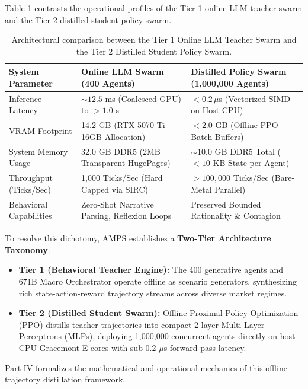 Table \ref{tab:online_vs_distilled_swarm} contrasts the operational profiles of the Tier 1 online LLM teacher swarm and the Tier 2 distilled student policy swarm.

\begin{table}[htbp]
\centering
\small
\begin{tabularx}{\textwidth}{p{4.0cm} p{4.6cm} X}
\toprule
\textbf{System Parameter} & \textbf{Online LLM Swarm (400 Agents)} & \textbf{Distilled Policy Swarm (1,000,000 Agents)} \\
\midrule
Inference Latency & $\sim 12.5$ ms (Coalesced GPU) to $> 1.0$ s & $< 0.2\,\mu$s (Vectorized SIMD on Host CPU) \\
VRAM Footprint & 14.2 GB (RTX 5070 Ti 16GB Allocation) & $< 2.0$ GB (Offline PPO Batch Buffers) \\
System Memory Usage & 32.0 GB DDR5 (2MB Transparent HugePages) & $\sim 10.0$ GB DDR5 Total ($< 10$ KB State per Agent) \\
Throughput (Ticks/Sec) & 1,000 Ticks/Sec (Hard Capped via SIRC) & $> 100,000$ Ticks/Sec (Bare-Metal Parallel) \\
Behavioral Capabilities & Zero-Shot Narrative Parsing, Reflexion Loops & Preserved Bounded Rationality \& Contagion \\
\bottomrule
\end{tabularx}
\caption{Architectural comparison between the Tier 1 Online LLM Teacher Swarm and the Tier 2 Distilled Student Policy Swarm.}
\label{tab:online_vs_distilled_swarm}
\end{table}

To resolve this dichotomy, AMPS establishes a \textbf{Two-Tier Architecture Taxonomy}:
\begin{itemize}
    \item \textbf{Tier 1 (Behavioral Teacher Engine):} The 400 generative agents and 671B Macro Orchestrator operate offline as scenario generators, synthesizing rich state-action-reward trajectory streams across diverse market regimes.
    \item \textbf{Tier 2 (Distilled Student Swarm):} Offline Proximal Policy Optimization (PPO) distills teacher trajectories into compact 2-layer Multi-Layer Perceptrons (MLPs), deploying 1,000,000 concurrent agents directly on host CPU Gracemont E-cores with sub-0.2 $\mu$s forward-pass latency.
\end{itemize}
Part IV formalizes the mathematical and operational mechanics of this offline trajectory distillation framework.
